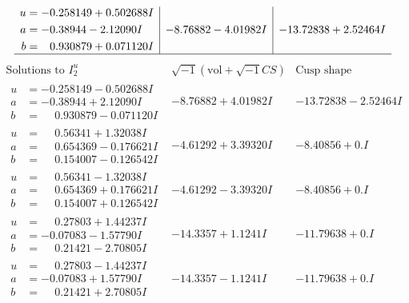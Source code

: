 \documentclass[1p]{elsarticle_modified}
\theoremstyle{definition}
\newcommand{\I}{\sqrt{-1}}
\begin{document}
$$\begin{array}{c|c|c}
\begin{aligned}
u &= -0.258149 + 0.502688 I \\
a &= -0.38944 - 2.12090 I \\
b &= \phantom{-}0.930879 + 0.071120 I\end{aligned}
 & -8.76882 - 4.01982 I & -13.72838 + 2.52464 I\\
 \hline 
 \end{array}$$\newpage$$\begin{array}{c|c|c}  
\text{Solutions to }I^u_{2}& \I (\text{vol} + \sqrt{-1}CS) & \text{Cusp shape}\\
 \hline 
\begin{aligned}
u &= -0.258149 - 0.502688 I \\
a &= -0.38944 + 2.12090 I \\
b &= \phantom{-}0.930879 - 0.071120 I\end{aligned}
 & -8.76882 + 4.01982 I & -13.72838 - 2.52464 I \\ \hline\begin{aligned}
u &= \phantom{-}0.56341 + 1.32038 I \\
a &= \phantom{-}0.654369 - 0.176621 I \\
b &= \phantom{-}0.154007 - 0.126542 I\end{aligned}
 & -4.61292 + 3.39320 I & -8.40856 + 0. I\phantom{ +0.000000I} \\ \hline\begin{aligned}
u &= \phantom{-}0.56341 - 1.32038 I \\
a &= \phantom{-}0.654369 + 0.176621 I \\
b &= \phantom{-}0.154007 + 0.126542 I\end{aligned}
 & -4.61292 - 3.39320 I & -8.40856 + 0. I\phantom{ +0.000000I} \\ \hline\begin{aligned}
u &= \phantom{-}0.27803 + 1.44237 I \\
a &= -0.07083 - 1.57790 I \\
b &= \phantom{-}0.21421 - 2.70805 I\end{aligned}
 & -14.3357 + 1.1241 I & -11.79638 + 0. I\phantom{ +0.000000I} \\ \hline\begin{aligned}
u &= \phantom{-}0.27803 - 1.44237 I \\
a &= -0.07083 + 1.57790 I \\
b &= \phantom{-}0.21421 + 2.70805 I\end{aligned}
 & -14.3357 - 1.1241 I & -11.79638 + 0. I\phantom{ +0.000000I} \\ \hline\begin{aligned}

\end{aligned}
\end{array}$$
\end{document}
